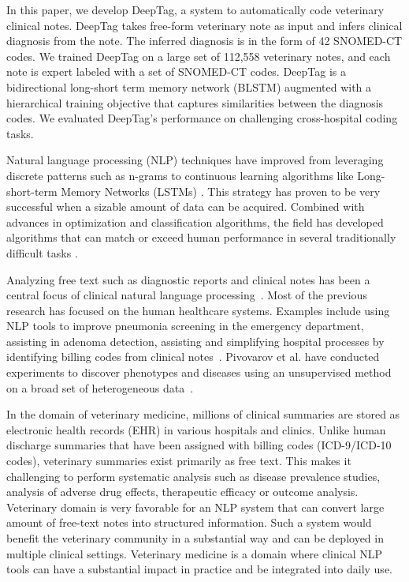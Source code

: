 \documentclass{article}[11pt,oneside]
\begin{document}
In this paper, we develop DeepTag, a system to automatically code veterinary clinical notes. DeepTag takes free-form veterinary note as input and infers clinical diagnosis from the note. The inferred diagnosis is in the form of 42 SNOMED-CT codes. We trained DeepTag on a large set of 112,558 veterinary notes, and each note is expert labeled with a set of SNOMED-CT codes. DeepTag is a bidirectional long-short term memory network (BLSTM) augmented with a hierarchical training objective that captures similarities between the diagnosis codes. We evaluated DeepTag's performance on challenging cross-hospital coding tasks.

Natural language processing (NLP)  techniques have improved from leveraging discrete patterns such as n-grams \cite{jurafsky2014speech} to continuous learning algorithms like Long-short-term Memory Networks (LSTMs) \cite{hochreiter1997long}. This strategy has proven to be very successful when a sizable amount of data can be acquired. Combined with advances in optimization and classification algorithms, the field has developed algorithms that can match or exceed human performance in several traditionally difficult tasks \cite{goldberg2017neural}.

Analyzing free text such as diagnostic reports and clinical notes has been a central focus of clinical natural language processing~\cite{velupillai2015recent}. Most of the previous research has focused on the human healthcare systems. Examples include using NLP tools to improve pneumonia screening in the emergency department, assisting in adenoma detection, assisting and simplifying hospital processes by identifying billing codes from clinical notes~\cite{demner2016aspiring}. Pivovarov et al. have conducted experiments to discover phenotypes and diseases using an unsupervised method on a broad set of heterogeneous data~\cite{pivovarov2015learning}.

In the domain of veterinary medicine, millions of clinical summaries are stored as electronic health records (EHR) in various hospitals and clinics. Unlike human discharge summaries that have been assigned with billing codes (ICD-9/ICD-10 codes), veterinary summaries exist primarily as free text. This makes it challenging to perform  systematic analysis  such as disease prevalence studies, analysis of adverse drug effects, therapeutic efficacy or outcome analysis. Veterinary domain is very favorable for an NLP system that can convert large amount of  free-text notes into structured information. Such a system would benefit the veterinary community in a substantial way and can be deployed in multiple clinical settings. Veterinary medicine is a domain where clinical NLP tools can have a substantial impact in practice and be integrated into daily use.
\end{document}
